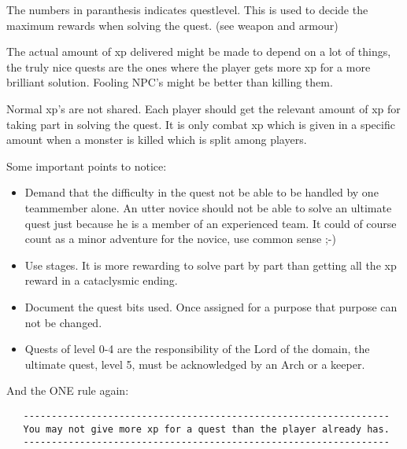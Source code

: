 The numbers in paranthesis indicates questlevel. This is used to decide
the maximum rewards when solving the quest. (see weapon and armour)

The actual amount of xp delivered might be made to depend on a lot of things,
the truly nice quests are the ones where the player gets more xp for a
more brilliant solution. Fooling NPC's might be better than killing them.

Normal xp's are not shared. Each player should get the relevant amount of xp
for taking part in solving the quest. It is only combat xp which is given
in a specific amount when a monster is killed which is split among players.

Some important points to notice:

\begin{itemize}
    \item  Demand that the difficulty in the quest not be able to be handled
      by one teammember alone. An utter novice should not be able to
      solve an ultimate quest just because he is a member of an
      experienced team. It could of course count as a minor adventure
      for the novice, use common sense ;-)

    \item  Use stages. It is more rewarding to solve part by part than 
      getting all the xp reward in a cataclysmic ending.

    \item  Document the quest bits used. Once assigned for a purpose that
      purpose can not be changed.

    \item  Quests of level 0-4 are the responsibility of the Lord of the domain,
      the ultimate quest, level 5, must be acknowledged by an Arch or a
      keeper.
\end{itemize}

And the ONE rule again:
\begin{verbatim}
   -----------------------------------------------------------------
   You may not give more xp for a quest than the player already has.
   -----------------------------------------------------------------
\end{verbatim}

